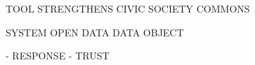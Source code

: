\color{blue}
TOOL
  STRENGTHENS CIVIC SOCIETY
  COMMONS

SYSTEM
  OPEN DATA
  DATA OBJECT
 
  - RESPONSE
  - TRUST
\color{darkgray}  
